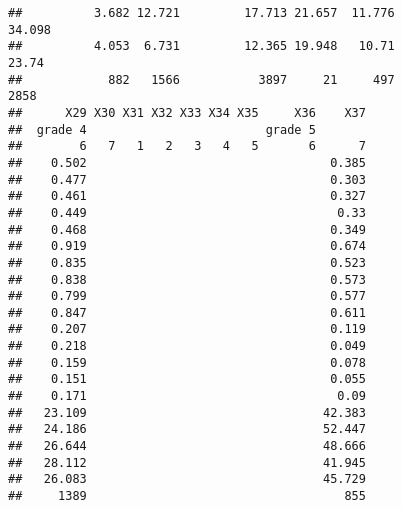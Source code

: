 \documentclass[
]{article}
\begin{document}
\begin{verbatim}
##          3.682 12.721         17.713 21.657  11.776                     34.098
##          4.053  6.731         12.365 19.948   10.71                      23.74
##            882   1566           3897     21     497                       2858
##      X29 X30 X31 X32 X33 X34 X35     X36    X37
##  grade 4                         grade 5       
##        6   7   1   2   3   4   5       6      7
##    0.502                                  0.385
##    0.477                                  0.303
##    0.461                                  0.327
##    0.449                                   0.33
##    0.468                                  0.349
##    0.919                                  0.674
##    0.835                                  0.523
##    0.838                                  0.573
##    0.799                                  0.577
##    0.847                                  0.611
##    0.207                                  0.119
##    0.218                                  0.049
##    0.159                                  0.078
##    0.151                                  0.055
##    0.171                                   0.09
##   23.109                                 42.383
##   24.186                                 52.447
##   26.644                                 48.666
##   28.112                                 41.945
##   26.083                                 45.729
##     1389                                    855
\end{verbatim}
\end{document}
